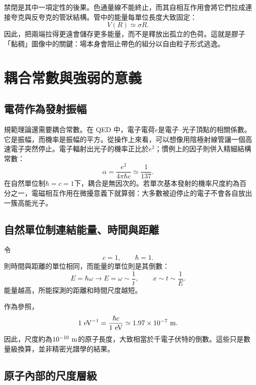 禁閉是其中一項定性的後果。色通量線不能終止，而其自相互作用會將它們拉成連接夸克與反夸克的管狀結構。管中的能量每單位長度大致固定：
\begin{equation}
V(R)\simeq \sigma R.
\end{equation}
因此，把兩端拉得更遠會儲存更多能量，而不是釋放出孤立的色荷。這就是膠子「黏稠」圖像中的關鍵：場本身會阻止帶色的組分以自由粒子形式逃逸。

\section{耦合常數與強弱的意義}

\subsection{電荷作為發射振幅}

規範理論還需要耦合常數。在 QED 中，電子電荷\(e\)是電子--光子頂點的相關係數。它是振幅，而機率是振幅的平方。從操作上來看，可以想像用陰極射線管讓一個高速電子突然停止。電子輻射出光子的機率正比於\(e^2\)；慣例上的因子則併入精細結構常數：
\begin{equation}
\alpha=\frac{e^2}{4\pi\hbar c}
\simeq \frac{1}{137}.
\label{eq:l5-alpha}
\end{equation}
在自然單位制\(\hbar=c=1\)下，耦合是無因次的。若單次基本發射的機率尺度約為百分之一，電磁相互作用在微擾意義下就算弱：大多數被迫停止的電子不會各自放出一簇高能光子。

\subsection{自然單位制連結能量、時間與距離}

令
\begin{equation}
c=1,
\qquad
\hbar=1.
\end{equation}
則時間與距離的單位相同，而能量的單位則是其倒數：
\begin{equation}
E=\hbar\omega\longrightarrow E=\omega\sim\frac1t,
\qquad
x\sim t\sim\frac1E.
\end{equation}
能量越高，所能探測的距離和時間尺度越短。

作為參照，
\begin{equation}
1\ {\rm eV}^{-1}
=\frac{\hbar c}{1\ {\rm eV}}
\simeq 1.97\times10^{-7}\ {\rm m}.
\end{equation}
因此，尺度約為\(10^{-10}\ {\rm m}\)的原子長度，大致相當於千電子伏特的倒數。這些只是數量級換算，並非精密光譜學的結果。

\subsection{原子內部的尺度層級}

